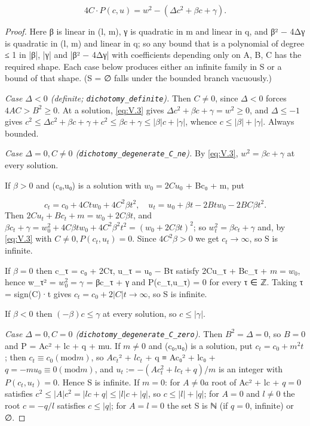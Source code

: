 \begin{equation}\tag{V.3}\label{eq:V.3}
4C·P(c,u) = w^{2} − (Δc^{2} + βc + γ).
\end{equation}
\begin{proof}
Here β is linear in (l, m), γ is quadratic in m and linear in q, and β² − 4Δγ is quadratic in (l, m) and linear in q; so any bound that is a polynomial of degree ≤ 1 in |β|, |γ| and |β² − 4Δγ| with coefficients depending only on A, B, C has the required shape. Each case below produces either an infinite family in S or a bound of that shape. (S = ∅ falls under the bounded branch vacuously.)

\emph{Case $Δ < 0$ (definite; \texttt{dichotomy\_\allowbreak{}definite}).} Then $C ≠ 0$, since $Δ < 0$ forces $4AC > B^{2} ≥ 0$. At a solution, \eqref{eq:V.3} gives $Δc^{2} + βc + γ = w^{2} ≥ 0$, and $Δ ≤ −1$ gives $c^{2} ≤ Δc^{2} + βc + γ + c^{2} ≤ βc + γ ≤ |β|c + |γ|$, whence $c ≤ |β| + |γ|$. Always bounded.

\emph{Case $Δ = 0, C ≠ 0$ (\texttt{dichotomy\_\allowbreak{}degenerate\_\allowbreak{}C\_\allowbreak{}ne}).} By \eqref{eq:V.3}, $w^{2} = βc + γ$ at every solution.

If $β > 0$ and (c₀,u₀) is a solution with $w_{0} = 2Cu_{0}$ + Bc₀ + m, put

\[
c_{t} = c_{0} + 4Ctw_{0} + 4C^{2}βt^{2}, \quad u_{t} = u_{0} + βt − 2Btw_{0} − 2BCβt^{2}.
\]
Then $2Cu_{t} + Bc_{t} + m = w_{0} + 2Cβt$, and $βc_{t} + γ = w_{0}^{2} + 4Cβtw_{0} + 4C^{2}β^{2}t^{2} = (w_{0} + 2Cβt)^{2}$; so $w_{t}^{2} = βc_{t} + γ$ and, by \eqref{eq:V.3} with $C ≠ 0, P(c_{t},u_{t}) = 0$. Since $4C^{2}β > 0$ we get $c_{t} → ∞$, so S is infinite.

If $β = 0$ then c\_τ = c₀ + 2Cτ, u\_τ = u₀ − Bτ satisfy 2Cu\_τ + Bc\_τ + $m = w_{0}$, hence w\_τ² = $w_{0}^{2} = γ$ = βc\_τ + γ and P(c\_τ,u\_τ) = 0 for every τ ∈ ℤ. Taking τ = sign(C)·t gives $c_{t} = c_{0} + 2|C|t → ∞$, so S is infinite.

If $β < 0$ then $(−β)c ≤ γ$ at every solution, so $c ≤ |γ|$.

\emph{Case $Δ = 0, C = 0$ (\texttt{dichotomy\_\allowbreak{}degenerate\_\allowbreak{}C\_\allowbreak{}zero}).} Then $B^{2} = Δ = 0$, so $B = 0$ and P = Ac² + lc + q + mu. If $m ≠ 0$ and (c₀,u₀) is a solution, put $c_{t} = c_{0} + m^{2}t$; then $c_{t} ≡ c_{0} (\mathrm{mod} m)$, so $Ac_{t}$² + $lc_{t}$ + q ≡ Ac₀² + lc₀ + $q = −mu_{0} ≡ 0 (\mathrm{mod} m)$, and $u_{t} := −(Ac_{t}^{2} + lc_{t} + q)/m$ is an integer with $P(c_{t},u_{t}) = 0$. Hence S is infinite. If $m = 0$: for $A ≠ 0 a$ root of Ac² + lc + $q = 0$ satisfies $c^{2} ≤ |A|c^{2} = |lc + q| ≤ |l|c + |q|$, so $c ≤ |l| + |q|$; for $A = 0$ and $l ≠ 0$ the root $c = −q/l$ satisfies $c ≤ |q|$; for $A = l = 0$ the set S is ℕ (if $q = 0$, infinite) or ∅.


\end{proof}
